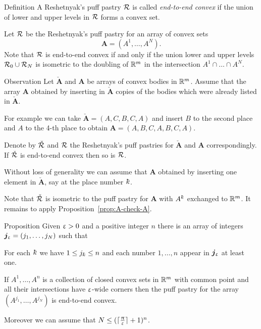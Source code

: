 \begin{thm}{Definition}
A Reshetnyak's puff pastry $\mathcal{R}$ 
is called \emph{end-to-end convex} 
if the union of lower and upper levels in $\mathcal{R}$ 
forms a convex set.
\end{thm}

Let $\mathcal{R}$ be the Reshetnyak's puff pastry for an array of convex sets 
\[\bm{A}=(A^{1},\dots, A^{N}).\]
Note that $\mathcal{R}$ is end-to-end convex
if and only if the union lower and upper levels
$\spc{R}_0\cup\spc{R}_N$ is isometric to the doubling of $\mathbb{R}^m$ in the intersection $A^1\cap\dots\cap A^N$.


\begin{thm}{Observation}\label{obs:end-to-end-convex}
Let $\check{\bm{A}}$ and $\bm{A}$ be arrays of convex bodies in $\mathbb{R}^m$.
Assume that 
the  array $\bm{A}$ 
obtained by inserting in $\check{\bm{A}}$
copies of the bodies which were already listed in $\check{\bm{A}}$.

For example we can take $\check{\bm{A}}=(A,C,B,C,A)$ 
and insert $B$ to the second place and $A$ to the 4-th place to obtain $\bm{A}=(A,B,C,A,B,C,A)$.

Denote by $\check{\mathcal{R}}$ and $\mathcal{R}$ 
the Reshetnyak's puff pastries for $\check{\bm{A}}$ and $\bm{A}$ correspondingly.
If $\check{\mathcal{R}}$ is end-to-end convex then so is $\mathcal{R}$.
\end{thm}

Without loss of generality we can assume that $\bm{A}$ 
obtained by inserting one element in $\check{\bm{A}}$,
say at the place number $\kay$.

Note that $\check{\mathcal{R}}$ is isometric to the puff pastry 
for $\bm{A}$ with $A^\kay$ exchanged to $\mathbb{R}^m$.
It remains to apply Proposition~\ref{prop:A-check-A}.
\qeds


\begin{thm}{Proposition}\label{prop:end-to-end-convex}
Given $\upvarepsilon>0$ and a positive integer $n$
there is an array of integers $\bm{j}_\eps=(j_1,\dots,j_N)$ 
such that 

\begin{subthm}{} For each $\kay$ we have $1\le j_\kay\le n$
and each number $1,\dots,n$ appear in $\bm{j}_\upvarepsilon$ at least one.
\end{subthm}

\begin{subthm}{}
If $A^1,\dots,A^n$ is a collection of closed convex sets in $\mathbb{R}^m$ with common point 
and all their intersections have $\upvarepsilon$-wide corners 
then the puff pastry for the array
$(A^{j_1},\dots,A^{j_N})$ is end-to-end convex.
\end{subthm}

Moreover we can assume that $N\le (\lceil\tfrac\pi\eps\rceil+1)^n$.
\end{thm}


